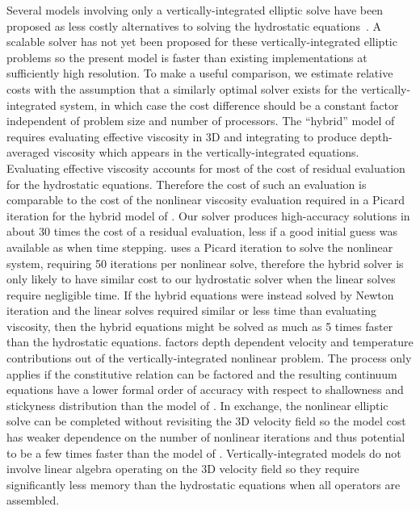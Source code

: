 \documentclass[draft,lineno,jgrga]{AGUTeX}
\makeatletter
\DeclareRobustCommand\onedot{\futurelet\@let@token\@onedot}
\def\@onedot{\ifx\@let@token.\else.\null\fi\xspace}
\def\eg{{e.g}\onedot} \def\Eg{{E.g}\onedot}
\makeatother
\begin{document}
\begin{article}
Several models involving only a vertically-integrated elliptic solve have been proposed as less costly alternatives to solving the hydrostatic equations~\citep[\eg][]{bueler2009shallow,goldberg2009grounding,goldberg2010variational}.
A scalable solver has not yet been proposed for these vertically-integrated elliptic problems so the present model is faster than existing implementations at sufficiently high resolution.
To make a useful comparison, we estimate relative costs with the assumption that a similarly optimal solver exists for the vertically-integrated system, in which case the cost difference should be a constant factor independent of problem size and number of processors.
The ``hybrid'' model of \cite{goldberg2010variational} requires evaluating effective viscosity in 3D and integrating to produce depth-averaged viscosity which appears in the vertically-integrated equations.
Evaluating effective viscosity accounts for most of the cost of residual evaluation for the hydrostatic equations.
Therefore the cost of such an evaluation is comparable to the cost of the nonlinear viscosity evaluation required in a Picard iteration for the hybrid model of \cite{goldberg2010variational}.
Our solver produces high-accuracy solutions in about 30 times the cost of a residual evaluation, less if a good initial guess was available as when time stepping.
\cite{goldberg2010variational} uses a Picard iteration to solve the nonlinear system, requiring 50 iterations per nonlinear solve, therefore the hybrid solver is only likely to have similar cost to our hydrostatic solver when the linear solves require negligible time.
If the hybrid equations were instead solved by Newton iteration and the linear solves required similar or less time than evaluating viscosity, then the hybrid equations might be solved as much as 5 times faster than the hydrostatic equations.
\cite{bueler2009shallow} factors depth dependent velocity and temperature contributions out of the vertically-integrated nonlinear problem.
The process only applies if the constitutive relation can be factored and the resulting continuum equations have a lower formal order of accuracy with respect to shallowness and stickyness distribution than the model of \cite{goldberg2010variational}.
In exchange, the nonlinear elliptic solve can be completed without revisiting the 3D velocity field so the model cost has weaker dependence on the number of nonlinear iterations and thus potential to be a few times faster than the model of \cite{goldberg2010variational}.
Vertically-integrated models do not involve linear algebra operating on the 3D velocity field so they require significantly less memory than the hydrostatic equations when all operators are assembled.


\end{article}
\end{document}
